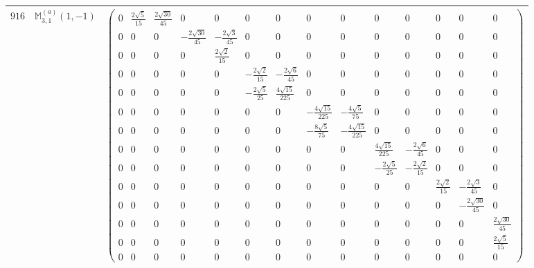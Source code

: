 \documentclass[fleqn,8pt,landscape]{jsarticle}
\begin{document}
\begin{center}
\begin{longtable}{ccc}
$ 916 $ & $ \mathbb{M}_{3,1}^{(a)}(1,-1) $ & $ \begin{pmatrix} 0 & \frac{2 \sqrt{5}}{15} & \frac{2 \sqrt{30}}{45} & 0 & 0 & 0 & 0 & 0 & 0 & 0 & 0 & 0 & 0 & 0 \\ 0 & 0 & 0 & - \frac{2 \sqrt{30}}{45} & - \frac{2 \sqrt{3}}{45} & 0 & 0 & 0 & 0 & 0 & 0 & 0 & 0 & 0 \\ 0 & 0 & 0 & 0 & \frac{2 \sqrt{2}}{15} & 0 & 0 & 0 & 0 & 0 & 0 & 0 & 0 & 0 \\ 0 & 0 & 0 & 0 & 0 & - \frac{2 \sqrt{2}}{15} & - \frac{2 \sqrt{6}}{45} & 0 & 0 & 0 & 0 & 0 & 0 & 0 \\ 0 & 0 & 0 & 0 & 0 & - \frac{2 \sqrt{5}}{25} & \frac{4 \sqrt{15}}{225} & 0 & 0 & 0 & 0 & 0 & 0 & 0 \\ 0 & 0 & 0 & 0 & 0 & 0 & 0 & - \frac{4 \sqrt{15}}{225} & - \frac{4 \sqrt{5}}{75} & 0 & 0 & 0 & 0 & 0 \\ 0 & 0 & 0 & 0 & 0 & 0 & 0 & - \frac{8 \sqrt{5}}{75} & - \frac{4 \sqrt{15}}{225} & 0 & 0 & 0 & 0 & 0 \\ 0 & 0 & 0 & 0 & 0 & 0 & 0 & 0 & 0 & \frac{4 \sqrt{15}}{225} & - \frac{2 \sqrt{6}}{45} & 0 & 0 & 0 \\ 0 & 0 & 0 & 0 & 0 & 0 & 0 & 0 & 0 & - \frac{2 \sqrt{5}}{25} & - \frac{2 \sqrt{2}}{15} & 0 & 0 & 0 \\ 0 & 0 & 0 & 0 & 0 & 0 & 0 & 0 & 0 & 0 & 0 & \frac{2 \sqrt{2}}{15} & - \frac{2 \sqrt{3}}{45} & 0 \\ 0 & 0 & 0 & 0 & 0 & 0 & 0 & 0 & 0 & 0 & 0 & 0 & - \frac{2 \sqrt{30}}{45} & 0 \\ 0 & 0 & 0 & 0 & 0 & 0 & 0 & 0 & 0 & 0 & 0 & 0 & 0 & \frac{2 \sqrt{30}}{45} \\ 0 & 0 & 0 & 0 & 0 & 0 & 0 & 0 & 0 & 0 & 0 & 0 & 0 & \frac{2 \sqrt{5}}{15} \\ 0 & 0 & 0 & 0 & 0 & 0 & 0 & 0 & 0 & 0 & 0 & 0 & 0 & 0 \end{pmatrix} $ \\ \hline

\end{longtable}
\end{center}
\end{document}
